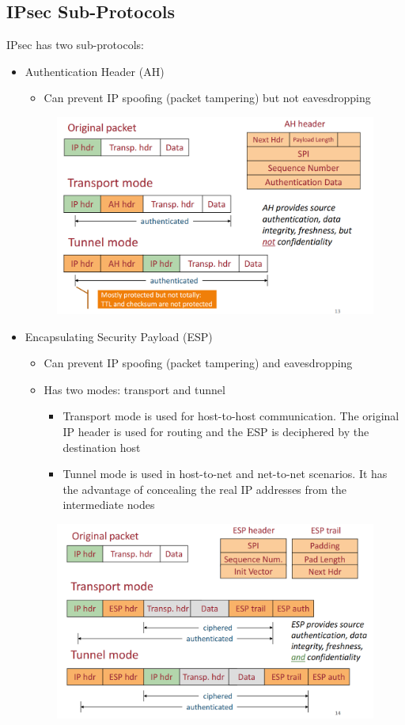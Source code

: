 \documentclass[10pt,a4paper]{report}
\begin{document}
\subsection{IPsec Sub-Protocols}
IPsec has two sub-protocols:
\begin{itemize}
\item Authentication Header (AH)
\begin{itemize}
\item Can prevent IP spoofing (packet tampering)
but not eavesdropping
\end{itemize}
\begin{figure}[H]
\centering
\includegraphics[scale=0.4]{39.png}
\end{figure}
\item Encapsulating Security Payload (ESP)
\begin{itemize}
\item Can prevent IP spoofing (packet tampering)
and eavesdropping
\item Has two modes: transport and tunnel
\begin{itemize}
\item Transport mode is used for host-to-host communication. The original IP header is used for routing and the ESP is deciphered by the destination host
\item Tunnel mode is used in host-to-net and net-to-net scenarios. It has the advantage of concealing the  real IP addresses from the intermediate nodes
\end{itemize}
\end{itemize}
\begin{figure}[H]
\centering
\includegraphics[scale=0.4]{40.png}
\end{figure}
\end{itemize}
\end{document}
